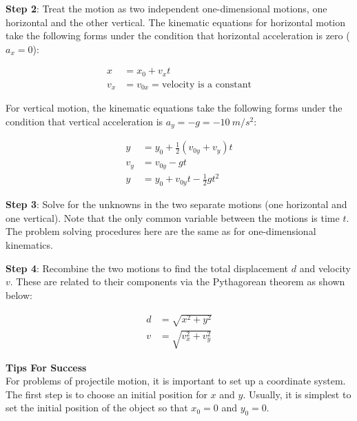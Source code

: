 \documentclass[main-physics.tex]{subfiles}
\begin{document}
\vspace{1em}

\textbf{Step 2}: Treat the motion as two independent one-dimensional motions, one horizontal and the other vertical. The kinematic equations for horizontal motion take the following forms under the condition that horizontal acceleration is zero ($a_x = 0$):

\vspace{-1em}

\begin{align}
    x &= x_0 + v_x t \label{7fMAPG}\\[0.5ex]
    v_x &= v_{0x} = \text{velocity is a constant} \label{dCvDf4}
\end{align}

For vertical motion, the kinematic equations take the following forms under the condition that vertical acceleration is $a_y = -g = \SI{-10}{m/s^2}$:

\begin{align}
    y &= y_0 + \frac{1}{2}\left(v_{0y} + v_y\right)t\\[0.5ex]
    v_y &= v_{0y} - gt \label{SjYaoE} \\[0.5ex]
    y &= y_0 + v_{0y}t - \frac{1}{2}  g t^2  \label{36YuvF}
\end{align}

\vspace{1em}

\textbf{Step 3}: Solve for the unknowns in the two separate motions (one horizontal and one vertical). Note that the only common variable between the motions is time $t$. The problem solving procedures here are the same as for one-dimensional kinematics.

\vspace{1em}

\textbf{Step 4}: Recombine the two motions to find the total displacement $d$ and velocity $v$. These are related to their components via the Pythagorean theorem as shown below:

\begin{align}
    d &= \sqrt{x^2 + y^2} \label{XvIie8} \\[0.5ex]
    v &= \sqrt{v_x^2 + v_y^2} \label{glASeI}
\end{align}

\begin{mdframed}[backgroundcolor=csOrange]
    \textbf{Tips For Success}\\
    For problems of projectile motion, it is important to set up a coordinate system. The first step is to choose an initial position for $x$ and $y$. Usually, it is simplest to set the initial position of the object so that $x_0 = 0$ and $y_0 = 0$.
\end{mdframed}
\end{document}
